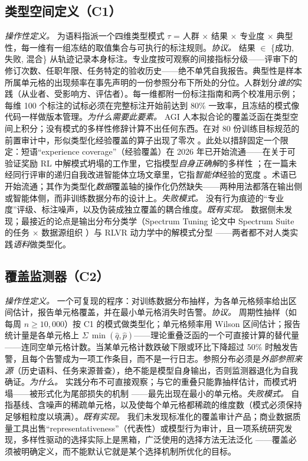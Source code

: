 \documentclass[10pt,fontset=fandol]{ctexart}
\begin{document}
\subsection{类型空间定义（C1）}

\emph{操作性定义。} 为语料指派一个四维类型模式 $\tau$ = 人群 $\times$ 结果 $\times$ 专业度 $\times$ 典型性，每一维有一组冻结的取值集合与可执行的标注规则。\emph{协议。} 结果 $\in$ \{成功, 失败, 混合\} 从轨迹记录本身标注。专业度按可观察的间接指标分级——评审下的修订次数、任职年限、任务特定的验收历史——绝不单凭自我报告。典型性是样本所属单元格的出现频率在事先声明的一份参照分布下所处的分位。人群划分\emph{谁的}实践（从业者、受影响方、评估者）。每一维都附一份标注指南和两个校准用示例；每维 100 个标注的试标必须在完整标注开始前达到 80\% 一致率，且冻结的模式像代码一样做版本管理。\emph{为什么需要此要素。} AGI 人本拟合论的覆盖泛函在类型空间上积分；没有模式的多样性修辞计算不出任何东西。在对 80 份训练目标规范的前置审计中，形似类型化经验覆盖的算子出现了零次 \cite{ref5}。此处以措辞固定一个限定：短语“experience coverage”（经验覆盖）在 2026 年已开始流通——在关于可验证奖励 RL 中解模式坍塌的工作里，它指模型\emph{自身正确解}的多样性 \cite{ref11}；在一篇未经同行评审的递归自我改进智能体立场文章里，它指\emph{智能体}经验的宽度 \cite{ref12}。术语已开始流通；其作为类型化\emph{数据}覆盖轴的操作化仍然缺失——两种用法都落在输出侧或智能体侧，而非训练数据分布的设计上。\emph{失败模式。} 没有行为痕迹的“专业度”评级、标注噪声，以及伪装成独立覆盖的耦合维度。\emph{既有实现。} 数据侧未发现；最接近的论点是输出分布分类学（Spectrum Tuning 论文中 Spectrum Suite 的任务 $\times$ 数据源组织 \cite{ref7}）与 RLVR 动力学中的解模式分型 \cite{ref11}——两者都不对人类实践\emph{语料}做类型化。

\subsection{覆盖监测器（C2）}

\emph{操作性定义。} 一个可复现的程序：对训练数据分布抽样，为各单元格频率给出区间估计，报告单元格覆盖，并在最小单元格消失时告警。\emph{协议。} 周期性抽样（如每周 $n \ge 10{,}000$）按 C1 的模式做类型化；单元格频率用 Wilson 区间估计；报告统计量是各单元格上 $\Sigma\,\min(\hat{q},\hat{p})$——理论重叠泛函的一个可直接计算的替代量——连同空单元格计数。当某单元格计数跌破下限或环比下降超过 50\% 时触发告警，且每个告警成为一项工作条目，而不是一行日志。参照分布必须是\emph{外部参照来源}（历史语料、任务来源普查），绝不能是模型自身输出，否则监测器退化为自我确证。\emph{为什么。} 实践分布不可直接观察；与它的重叠只能靠抽样估计，而模式坍塌——被形式化为尾部损失的机制 \cite{ref4}——最先出现在最小的单元格。\emph{失败模式。} 自指基线、含噪声的稀疏单元格，以及使每个单元格都稀疏的维度数（模式必须保持足够粗粒度以填满）。\emph{既有实现。} 我们未发现标准化的覆盖审计产品；商业数据质量工具出售“representativeness”（代表性）或模型行为审计，且一项系统研究发现，多样性驱动的选择实际上是黑箱，广泛使用的选择方法无法泛化 \cite{ref13}——覆盖必须被明确定义，而不能默认它就是某个选择机制所优化的目标。
\end{document}
